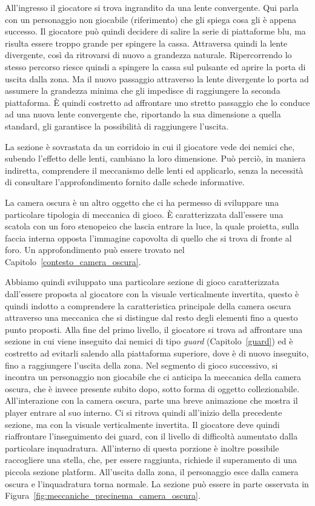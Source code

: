 All’ingresso il giocatore si trova ingrandito da una lente convergente. Qui parla con un personaggio non giocabile (riferimento) che gli spiega cosa gli è appena successo. Il giocatore può quindi decidere di salire la serie di piattaforme blu, ma risulta essere troppo grande per spingere la cassa. Attraversa quindi la lente divergente, così da ritrovarsi di nuovo a grandezza naturale. Ripercorrendo lo stesso percorso riesce quindi a spingere la cassa sul pulsante ed aprire la porta di uscita dalla zona. Ma il nuovo passaggio attraverso la lente divergente lo porta ad assumere la grandezza minima che gli impedisce di raggiungere la seconda piattaforma. È quindi costretto ad affrontare uno stretto passaggio che lo conduce ad una nuova lente convergente che, riportando la sua dimensione a quella standard, gli garantisce la possibilità di raggiungere l’uscita.

La sezione è sovrastata da un corridoio in cui il giocatore vede dei nemici che, subendo l’effetto delle lenti, cambiano la loro dimensione. Può perciò, in maniera indiretta, comprendere il meccanismo delle lenti ed applicarlo, senza la necessità di consultare l’approfondimento fornito dalle schede informative.

La camera oscura è un altro oggetto che ci ha permesso di sviluppare una particolare tipologia di meccanica di gioco. È caratterizzata dall’essere una scatola con un foro stenopeico che lascia entrare la luce, la quale proietta, sulla faccia interna opposta l’immagine capovolta di quello che si trova di fronte al foro. Un approfondimento può essere trovato nel Capitolo~\ref{contesto_camera_oscura}.

Abbiamo quindi sviluppato una particolare sezione di gioco caratterizzata dall’essere proposta al giocatore con la visuale verticalmente invertita, questo è quindi indotto a comprendere la caratteristica principale della camera oscura attraverso una meccanica che si distingue dal resto degli elementi fino a questo punto proposti.
Alla fine del primo livello, il giocatore si trova ad affrontare una sezione in cui viene inseguito dai nemici di tipo \textit{guard} (Capitolo~\ref{guard}) ed è costretto ad evitarli salendo alla piattaforma superiore, dove è di nuovo inseguito, fino a raggiungere l’uscita della zona. Nel segmento di gioco successivo, si incontra un personaggio non giocabile che ci anticipa la meccanica della camera oscura, che è invece presente subito dopo, sotto forma di oggetto collezionabile.
All’interazione con la camera oscura, parte una breve animazione che mostra il player entrare al suo interno. Ci si ritrova quindi all’inizio della precedente sezione, ma con la visuale verticalmente invertita. Il giocatore deve quindi riaffrontare l’inseguimento dei guard, con il livello di difficoltà aumentato dalla particolare inquadratura. All’interno di questa porzione è inoltre possibile raccogliere una stella, che, per essere raggiunta, richiede il superamento di una piccola sezione platform.
All’uscita dalla zona, il personaggio esce dalla camera oscura e l’inquadratura torna normale.
La sezione può essere in parte osservata in Figura~\ref{fig:meccaniche_precinema_camera_oscura}.

